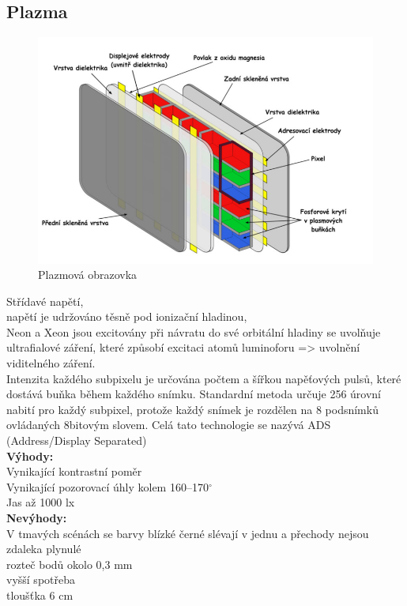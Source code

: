 \subsection{Plazma}
    \begin{figure}[h]
   \begin{center}
     \includegraphics[scale=0.4]{images/Plazma.png}
   \end{center}
   \caption{Plazmová obrazovka}
  \end{figure}

Střídavé napětí,\\
napětí je udržováno těsně pod ionizační hladinou,\\
Neon a Xeon jsou excitovány při návratu do své orbitální hladiny se uvolňuje ultrafialové záření, které způsobí excitaci atomů luminoforu => uvolnění viditelného záření.\\
Intenzita každého subpixelu je určována počtem a šířkou napěťových pulsů, které dostává
buňka během každého snímku.
Standardní metoda určuje 256 úrovní nabití pro každý subpixel, protože každý snímek je
rozdělen na 8 podsnímků ovládaných 8bitovým slovem. Celá tato technologie se nazývá ADS
(Address/Display Separated)\\
\textbf{Výhody:}\\
Vynikající kontrastní poměr\\
Vynikající pozorovací úhly kolem 160–170$^{\circ}$\\
Jas až 1000 lx\\

\textbf{Nevýhody:}\\
V tmavých scénách se barvy blízké černé slévají v jednu a přechody nejsou zdaleka plynulé\\
rozteč bodů okolo 0,3 mm\\
vyšší spotřeba\\
tloušťka 6 cm\\
